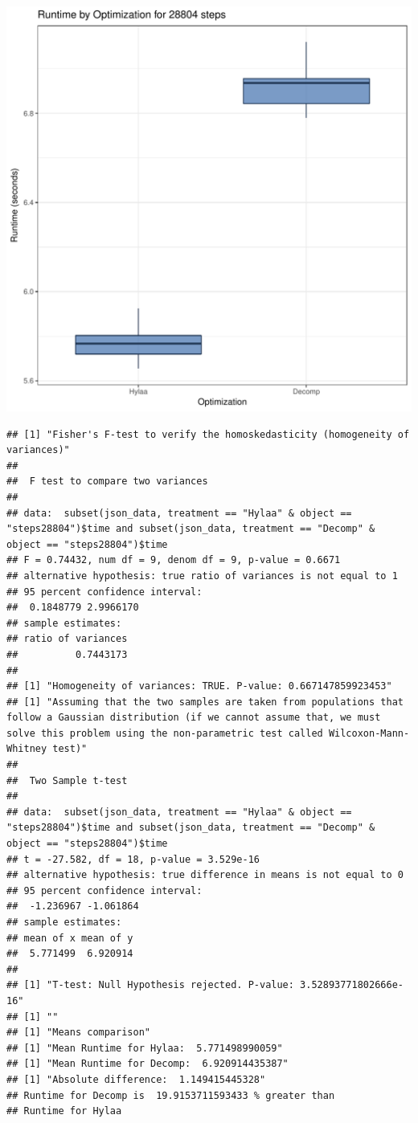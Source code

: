 \documentclass{article}\usepackage[]{graphicx}\usepackage[]{color}
\makeatletter
\def\maxwidth{ %
  \ifdim\Gin@nat@width>\linewidth
    \linewidth
  \else
    \Gin@nat@width
  \fi
}
\newenvironment{kframe}{%
 \def\at@end@of@kframe{}%
 \ifinner\ifhmode%
  \def\at@end@of@kframe{\end{minipage}}%
  \begin{minipage}{\columnwidth}%
 \fi\fi%
 \def\FrameCommand##1{\hskip\@totalleftmargin \hskip-\fboxsep
 \colorbox{shadecolor}{##1}\hskip-\fboxsep
     \hskip-\linewidth \hskip-\@totalleftmargin \hskip\columnwidth}%
 \MakeFramed {\advance\hsize-\width
   \@totalleftmargin\z@ \linewidth\hsize
   \@setminipage}}%
 {\par\unskip\endMakeFramed%
 \at@end@of@kframe}
\newenvironment{knitrout}{}{} %
\makeatother
\begin{document}
\begin{knitrout}
\color{fgcolor}
\includegraphics[width=\maxwidth]{figure/RH2_steps28804-1} 
\begin{kframe}\begin{verbatim}
## [1] "Fisher's F-test to verify the homoskedasticity (homogeneity of variances)"
## 
## 	F test to compare two variances
## 
## data:  subset(json_data, treatment == "Hylaa" & object == "steps28804")$time and subset(json_data, treatment == "Decomp" & object == "steps28804")$time
## F = 0.74432, num df = 9, denom df = 9, p-value = 0.6671
## alternative hypothesis: true ratio of variances is not equal to 1
## 95 percent confidence interval:
##  0.1848779 2.9966170
## sample estimates:
## ratio of variances 
##          0.7443173 
## 
## [1] "Homogeneity of variances: TRUE. P-value: 0.667147859923453"
## [1] "Assuming that the two samples are taken from populations that follow a Gaussian distribution (if we cannot assume that, we must solve this problem using the non-parametric test called Wilcoxon-Mann-Whitney test)"
## 
## 	Two Sample t-test
## 
## data:  subset(json_data, treatment == "Hylaa" & object == "steps28804")$time and subset(json_data, treatment == "Decomp" & object == "steps28804")$time
## t = -27.582, df = 18, p-value = 3.529e-16
## alternative hypothesis: true difference in means is not equal to 0
## 95 percent confidence interval:
##  -1.236967 -1.061864
## sample estimates:
## mean of x mean of y 
##  5.771499  6.920914 
## 
## [1] "T-test: Null Hypothesis rejected. P-value: 3.52893771802666e-16"
## [1] ""
## [1] "Means comparison"
## [1] "Mean Runtime for Hylaa:  5.771498990059"
## [1] "Mean Runtime for Decomp:  6.920914435387"
## [1] "Absolute difference:  1.149415445328"
## Runtime for Decomp is  19.9153711593433 % greater than 
## Runtime for Hylaa
\end{verbatim}
\end{kframe}
\end{knitrout}
\end{document}
